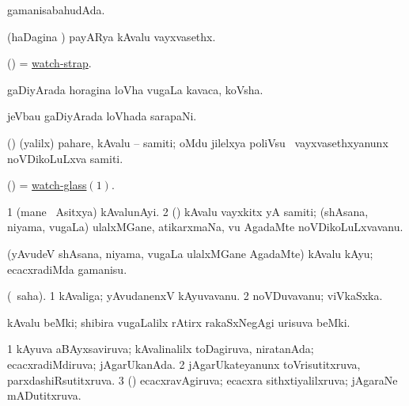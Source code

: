 \bentry
{} 
\gl{\gu}
\expl{}
\bmng
gamanisabahudAda. 
\emng
\eentry

\bentry
{} 
\gl{\nA}
\expl{}
\bmng
(haDagina \vi) payARya kAvalu vayxvasethx. 
\emng
\eentry

\bentry
{} 
\gl{\nA}
\expl{}
\bmng
(\ame) = \hyperlink{watch-strap}{watch-strap}. 
\emng
\eentry

\bentry
{} 
\gl{\nA}
\expl{}
\bmng
gaDiyArada horagina loVha \mo vugaLa kavaca, koVsha. 
\emng
\eentry

\bentry
{} 
\gl{\nA}
\expl{}
\bmng
jeVbau gaDiyArada loVhada sarapaNi. 
\emng
\eentry

\bentry
{} 
\gl{\nA}
\expl{}
\bmng
(\ca) (\UK yalilx) pahare, kAvalu -- samiti; oMdu jilelxya poliVsu \mo\ vayxvasethxyanunx noVDikoLuLxva samiti. 
\emng
\eentry

\bentry
{} 
\gl{\nA}
\expl{}
\bmng
(\ame) = \hyperlink{watch-glass}{watch-glass\((1)\)}. 
\emng
\eentry

\bentry
{} 
\gl{\nA}
\expl{}
\bmng
\bnum
\num{1} (mane \mo\ Asitxya) kAvalunAyi. 
\num{2} (\rUpa) kAvalu vayxkitx yA samiti; (shAsana, niyama, \mo vugaLa) ulalxMGane, atikarxmaNa, \mo vu AgadaMte noVDikoLuLxvavanu. 
\enum
\emng
\eentry

\bentry
{} 
\gl{\sakirx}
\bmng
(yAvudeV shAsana, niyama, \mo vugaLa ulalxMGane AgadaMte) kAvalu kAyu; ecacxradiMda gamanisu. 
\emng
\eentry

\bentry
{} 
\gl{\nA}
\expl{}
\bmng
(\saupa\ saha). 
\bnum
\num{1} kAvaliga; yAvudanenxV kAyuvavanu. 
\num{2} noVDuvavanu; viVkaSxka. 
\enum
\emng
\eentry

\bentry
{} 
\gl{\nA}
\expl{}
\bmng
kAvalu beMki; shibira \mo vugaLalilx rAtirx rakaSxNegAgi urisuva beMki. 
\emng
\eentry

\bentry
{} 
\gl{\gu}
\expl{}
\bmng
\bnum
\num{1} kAyuva aBAyxsaviruva; kAvalinalilx toDagiruva, niratanAda; ecacxradiMdiruva; jAgarUkanAda. 
\num{2} jAgarUkateyanunx toVrisutitxruva, parxdashiRsutitxruva. 
\num{3} (\pArxparx) ecacxravAgiruva; ecacxra sithxtiyalilxruva; jAgaraNe mADutitxruva. 
\enum
\emng
\eentry

